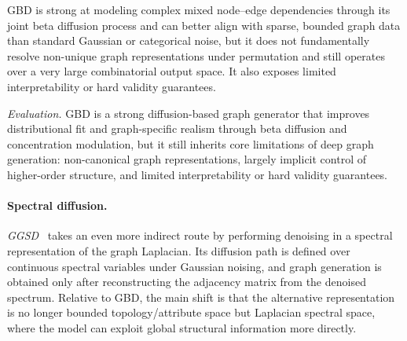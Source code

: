 \documentclass{article}
\begin{document}
GBD is strong at modeling complex mixed node–edge dependencies through its joint beta diffusion process and can better align with sparse, bounded graph data than standard Gaussian or categorical noise, but it does not fundamentally resolve non-unique graph representations under permutation and still operates over a very large combinatorial output space. It also exposes limited interpretability or hard validity guarantees.


\emph{Evaluation.} GBD is a strong diffusion-based graph generator that improves distributional fit and graph-specific realism through beta diffusion and concentration modulation, but it still inherits core limitations of deep graph generation: non-canonical graph representations, largely implicit control of higher-order structure, and limited interpretability or hard validity guarantees.

\paragraph{Spectral diffusion.}
\emph{GGSD}~\cite{minello2024generating} takes an even more indirect route by performing denoising in a spectral representation of the graph Laplacian. Its diffusion path is defined over continuous spectral variables under Gaussian noising, and graph generation is obtained only after reconstructing the adjacency matrix from the denoised spectrum. Relative to GBD, the main shift is that the alternative representation is no longer bounded topology/attribute space but Laplacian spectral space, where the model can exploit global structural information more directly.
\end{document}
